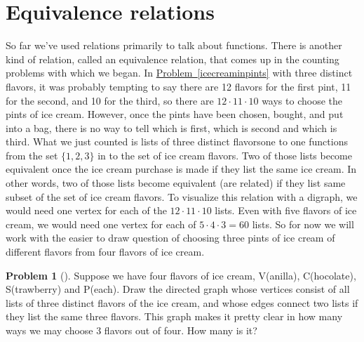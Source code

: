 \documentclass[10pt,]{book}
\theoremstyle{plain}
\theoremstyle{definition}
\newtheorem{activity}[project]{Problem}
\theoremstyle{definition}
\numberwithin{equation}{chapter}
\begin{document}
\section[{Equivalence relations}]{Equivalence relations}\label{equivalencerelations}
\hypertarget{p-1923}{}%
So far we've used relations primarily to talk about functions. There is another kind of relation, called an equivalence relation, that comes up in the counting problems with which we began. In \hyperref[icecreaminpints]{Problem~\ref{icecreaminpints}} with three distinct flavors, it was probably tempting to say there are 12 flavors for the first pint, 11 for the second, and 10 for the third, so there are \(12\cdot 11\cdot 10\) ways to choose the pints of ice cream. However, once the pints have been chosen, bought, and put into a bag, there is no way to tell which is first, which is second and which is third. What we just counted is lists of three distinct flavors\textemdash{}one to one functions from the set \(\{1,2,3\}\) in to the set of ice cream flavors. Two of those lists become equivalent once the ice cream purchase is made if they list the same ice cream. In other words, two of those lists become equivalent (are related) if they list same subset of the set of ice cream flavors. To visualize this relation with a digraph, we would need one vertex for each of the \(12\cdot 11\cdot 10\) lists. Even with five flavors of ice cream, we would need one vertex for each of \(5\cdot4\cdot3=60\) lists. So for now we will work with the easier to draw question of choosing three pints of ice cream of different flavors from four flavors of ice cream.%
\begin{activity}[]\marginsymbol[-1em]{} \label{fourchoosethree}
\hypertarget{p-1924}{}%
Suppose we have four flavors of ice cream, V(anilla), C(hocolate), S(trawberry) and P(each). Draw the directed graph whose vertices consist of all lists of three distinct flavors of the ice cream, and whose edges connect two lists if they list the same three flavors. This graph makes it pretty clear in how many ways we may choose 3 flavors out of four. How many is it?%
\end{activity}
\end{document}
